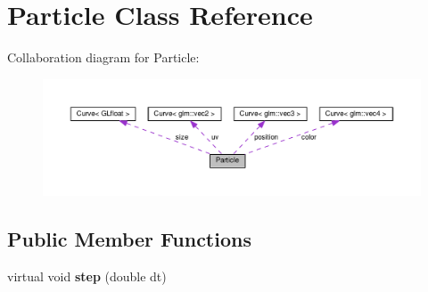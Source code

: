 \hypertarget{class_particle}{}\section{Particle Class Reference}
\label{class_particle}


Collaboration diagram for Particle\+:\nopagebreak
\begin{figure}[H]
\begin{center}
\leavevmode
\includegraphics[width=350pt]{class_particle__coll__graph}
\end{center}
\end{figure}
\subsection*{Public Member Functions}
\begin{DoxyCompactItemize}
\item 
\hypertarget{class_particle_a4d305fe8deed42f61776100729b6298e}{}virtual void {\bfseries step} (double dt)\label{class_particle_a4d305fe8deed42f61776100729b6298e}

\end{DoxyCompactItemize}
